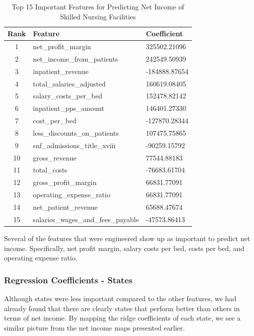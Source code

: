 \documentclass{article}
\theoremstyle{mytheoremstyle}
\theoremstyle{mytheoremstyle}
\theoremstyle{myproblemstyle}
\begin{document}
\begin{table}[h]
\centering
\caption{Top 15 Important Features for Predicting Net Income of Skilled Nursing Facilities}
\begin{tabular}{cll}
\toprule
Rank & Feature                & Coefficient           \\
\midrule
1    & net\_profit\_margin      & 325502.21096 \\
2    & net\_income\_from\_patients & 242549.50939 \\
3    & inpatient\_revenue       & -184888.87654 \\
4    & total\_salaries\_adjusted  & 160619.08405 \\
5    & salary\_costs\_per\_bed    & 152478.82142 \\
6    & inpatient\_pps\_amount    & 146401.27330 \\
7    & cost\_per\_bed            & -127870.28344 \\
8    & less\_discounts\_on\_patients & 107475.75865 \\
9    & snf\_admissions\_title\_xviii & -90259.15792 \\
10   & gross\_revenue            & 77544.88183 \\
11   & total\_costs              & -76683.61704 \\
12   & gross\_profit\_margin      & 66831.77091 \\
13   & operating\_expense\_ratio  & 66831.77091 \\
14   & net\_patient\_revenue      & 65688.47674 \\
15   & salaries\_wages\_and\_fees\_payable & -47573.86413 \\
\bottomrule
\end{tabular}
\end{table}

Several of the features that were engineered show up as important to predict net income. Specifically, net profit margin, salary costs per bed, costs per bed, and operating expense ratio. 

\pagebreak


\subsubsection{Regression Coefficients - States}

Although states were less important compared to the other features, we had already found that there are clearly states that perform better than others in terms of net income. By mapping the ridge coefficients of each state, we see a similar picture from the net income maps presented earlier.
\end{document}
